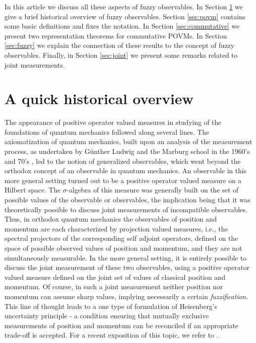 \documentclass[12pt]{amsart}
\theoremstyle{definition}
\begin{document}
In this article we discuss all these aspects of fuzzy observables. In Section \ref{sec:history}
we give a brief historical overview of fuzzy observables. Section \ref{sec:povm} contains
some basic definitions and fixes the notation. In Section \ref{sec:commutative} we present
two representation theorems for commutative POVMs. In Section \ref{sec:fuzzy} we
explain the connection of these results to the concept of fuzzy observables.  Finally, in
Section \ref{sec:joint} we present some remarks related to joint measurements.


\section{A quick historical overview}\label{sec:history}

The appearance of positive operator valued measures in studying of the foundations
of quantum mechanics followed along several lines. The axiomatization of quantum
mechanics, built upon an analysis of the measurement process,  as undertaken by
G\"unther Ludwig and the Marburg school in the 1960's and 70's
 \cite{Ludwig64,Ludwig70}, led to the notion of generalized observables, which
 went beyond the orthodox concept of an observable in quantum mechanics. An observable
in this more general setting turned out to be a positive operator valued measure on a
Hilbert space. The $\sigma$-algebra of this measure was generally built on the set of
possible values of the observable or observables, the implication being that it was
theoretically possible to discuss joint measurements of incompatible observables.
Thus, in orthodox quantum mechanics the observables of position and momentum are
each characterized by projection valued measures, i.e., the spectral projectors of the
corresponding self adjoint operators, defined on the space of possible observed
values of position and momentum,
and they are not simultaneously measurable. In the more general setting, it is entirely
possible to discuss the joint measurement of these two observables, using a positive
operator valued measure defined on the joint set of values of classical position and
momentum. Of course, in such a joint measurement neither position nor momentum can
assume sharp values, implying  necessarily a certain {\em fuzzification\/.} This line of
thought leads to a one type of formulation of Heisenberg's uncertainty principle -  a
condition ensuring that mutually exclusive measurements of position and momentum
can be reconciled if an appropriate trade-off is accepted. For a recent exposition of
this topic, we refer to \cite{BuHeLa07}.
\end{document}
